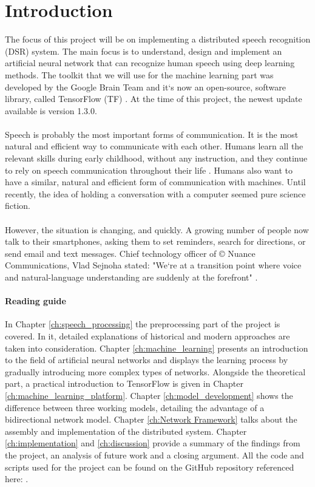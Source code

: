\chapter{Introduction}\label{ch:introduction}
The focus of this project will be on implementing a distributed speech recognition (DSR) system.
The main focus is to understand, design and implement an artificial neural network that can recognize human speech using deep learning methods.
The toolkit that we will use for the machine learning part was developed by the Google Brain Team and it`s now an open-source, software library, called TensorFlow (TF) \cite{tensorflow2015-whitepaper}.
At the time of this project, the newest update available is version 1.3.0.\\\\
Speech is probably the most important forms of communication.
It is the most natural and efficient way to communicate with
each other. Humans learn all the relevant skills during early
childhood, without any instruction, and they continue to rely
on speech communication throughout their life \cite{kamblespeech}.
Humans also want to have a similar, natural and efficient form of communication with machines. 
Until recently, the idea of holding a conversation with a computer seemed pure science fiction.\\\\
However, the situation is changing, and quickly.
A growing number of people now talk to their smartphones, asking them to set reminders, search for directions, or send email and text messages.
Chief technology officer of \copyright{} Nuance Communications, Vlad Sejnoha stated: "We`re at a transition point where voice and natural-language understanding are suddenly at the forefront" \cite{kamblespeech}.
\subsubsection{Reading guide}
In Chapter \ref{ch:speech_processing} the preprocessing 
part of the project is covered. In it, detailed 
explanations of historical and modern approaches are 
taken into consideration.
Chapter \ref{ch:machine_learning} presents an 
introduction to the field of artificial neural networks 
and displays the learning process by gradually 
introducing more complex types of networks.
Alongside the theoretical part,
a practical introduction to TensorFlow is given
in Chapter \ref{ch:machine_learning_platform}.
Chapter \ref{ch:model_development} shows the
difference between three working models,
detailing the advantage of a bidirectional
network model. Chapter \ref{ch:Network Framework}
talks about the assembly and implementation of
the distributed system.
Chapter \ref{ch:implementation} and \ref{ch:discussion}
provide a summary of the findings from the project, an 
analysis of future work and a closing argument.
All the code and scripts used for the project can be 
found on the GitHub repository referenced here: \cite{mavericks2017}.